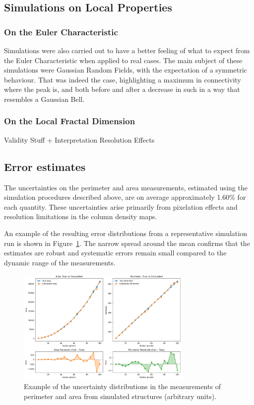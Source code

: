 \subsection{Simulations on Local Properties}

\subsubsection{On the Euler Characteristic}
Simulations were also carried out to have a better feeling of what to expect from the Euler Characteristic when applied to real cases. The main subject of these simulations were Gaussian Random Fields, with the expectation of a symmetric behaviour. That was indeed the case, highlighting a maximum in connectivity where the peak is, and both before and after a decrease in such in a way that resembles a Gaussian Bell.

\subsubsection{On the Local Fractal Dimension}
Validity Stuff + Interpretation
Resolution Effects

\subsection{Error estimates}

The uncertainties on the perimeter and area measurements, estimated using the simulation procedures described above, are on average approximately 1.60\% for each quantity. These uncertainties arise primarily from pixelation effects and resolution limitations in the column density maps.  

An example of the resulting error distributions from a representative simulation run is shown in Figure~\ref{fig:uncertainties}. The narrow spread around the mean confirms that the estimates are robust and systematic errors remain small compared to the dynamic range of the measurements.

\begin{figure}[t]
    \centering
    \includegraphics[width=0.75\textwidth]{figures/perimeter_area_uncertainties.png}
    \caption{Example of the uncertainty distributions in the measurements of perimeter and area from simulated structures (arbitrary units).}
    \label{fig:uncertainties}
\end{figure}

